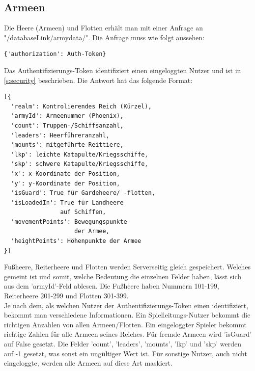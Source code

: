 \documentclass[11pt,a4paper,twocolumn]{article}
\begin{document}
\subsection{Armeen}\label{ss:read_armies}
Die Heere (Armeen) und Flotten erhält man mit einer Anfrage an "/databaseLink/armydata/". Die Anfrage muss wie folgt aussehen:
\begin{lstlisting}
{'authorization': Auth-Token}
\end{lstlisting}
Das Authentifizierungs-Token identifiziert einen eingeloggten Nutzer und ist in \ref{s:security} beschrieben. Die Antwort hat das folgende Format:
\begin{lstlisting}
[{
  'realm': Kontrolierendes Reich (Kürzel),
  'armyId': Armeenummer (Phoenix),
  'count': Truppen-/Schiffsanzahl,
  'leaders': Heerführeranzahl,
  'mounts': mitgeführte Reittiere,
  'lkp': leichte Katapulte/Kriegsschiffe,
  'skp': schwere Katapulte/Kriegsschiffe,
  'x': x-Koordinate der Position,
  'y': y-Koordinate der Position,
  'isGuard': True für Gardeheere/ -flotten,
  'isLoadedIn': True für Landheere
				auf Schiffen,
  'movementPoints': Bewegungspunkte 
					der Armee,
  'heightPoints': Höhenpunkte der Armee
}]
\end{lstlisting}
Fußheere, Reiterheere und Flotten werden Serverseitig gleich gespeichert. Welches gemeint ist und somit, welche Bedeutung die einzelnen Felder haben, lässt sich aus dem 'armyId'-Feld ablesen. Die Fußheere haben Nummern 101-199, Reiterheere 201-299 und Flotten 301-399.\\
Je nach dem, als welchen Nutzer der Authentifizierungs-Token einen identifiziert, bekommt man verschiedene Informationen. Ein Spielleitungs-Nutzer bekommt die richtigen Anzahlen von allen Armeen/Flotten. Ein eingeloggter Spieler bekommt richtige Zahlen für alle Armeen seines Reiches. Für fremde Armeen wird 'isGuard' auf False gesetzt. Die Felder 'count', 'leaders', 'mounts', 'lkp' und 'skp' werden auf -1 gesetzt, was sonst ein ungültiger Wert ist. Für sonstige Nutzer, auch nicht eingeloggte, werden alle Armeen auf diese Art maskiert.
\end{document}
